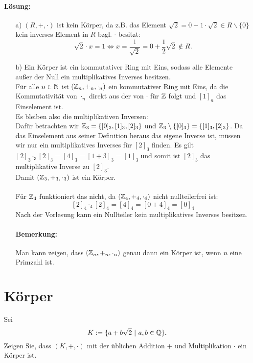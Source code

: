 \documentclass[
				a4paper,
				10pt
			]
			{scrartcl}
\begin{document}
\paragraph{L\"osung:}
\begin{itemize}
\item[a)]
$(R,+,\cdot)$ ist kein K\"orper, da z.B. das Element $\sqrt{2} = 0 + 1\cdot\sqrt{2}\in R\backslash\{0\}$ kein inverses Element in $R$ bzgl. $\cdot$ besitzt:
$$
	\sqrt{2}\cdot x = 1 \iff x = \frac{1}{\sqrt{2}}=0+\frac{1}{2}\sqrt{2} \notin R.
$$
\item[b)]
Ein K\"orper ist ein kommutativer Ring mit Eins, sodass alle Elemente au\ss er der Null ein multiplikatives Inverses besitzen.\\
F\"ur alle $n \in \mathbb{N}$ ist $(\mathbb{Z}_n,+_n,\cdot_n)$ ein kommutativer Ring mit Eins, da die Kommutativit\"at von $\cdot_n$ direkt aus der von $\cdot$ f\"ur $\mathbb{Z}$ folgt und $[1]_n$ das Einselement ist.\\
Es bleiben also die multiplikativen Inversen:\\
Daf\"ur betrachten wir $\mathbb{Z}_3=\{[0]_3,[1]_3,[2]_3\}$ und $\mathbb{Z}_3 \setminus \{[0]_3\}=\{[1]_3,[2]_3\}$. Da das Einselement aus seiner Definition heraus das eigene Inverse ist, m\"ussen wir nur ein multiplikatives Inverses f\"ur $[2]_3$ finden. Es gilt $[2]_3 \cdot_3 [2]_3=[4]_3=[1+3]_3=[1]_3$ und somit ist $[2]_3$ das multiplikative Inverse zu $[2]_3$. \\Damit $(\mathbb{Z}_3,+_3,\cdot_3)$ ist ein K\"orper.\\
\quad\\
F\"ur $\mathbb{Z}_4$ funktioniert das nicht, da $(\mathbb{Z}_4,+_4,\cdot_4)$ nicht nullteilerfrei ist: 
$$
[2]_4 \cdot_4 [2]_4 = [4]_4=[0+4]_4=[0]_4
$$
Nach der Vorlesung kann ein Nullteiler kein multiplikatives Inverses besitzen.
%
\paragraph{Bemerkung:} Man kann zeigen, dass $(\mathbb{Z}_n,+_n,\cdot_n)$ genau dann ein K\"orper ist, wenn $n$ eine Primzahl ist.
\end{itemize}



\section{K\"orper}

Sei
$$
	K := \{ a + b\sqrt{2} ~|~a,b \in \mathbb{Q} \}. 
$$
Zeigen Sie, dass $(K,+,\cdot)$ mit der \"ublichen Addition $+$ und Multiplikation $\cdot$ ein  K\"orper ist.
\end{document}
